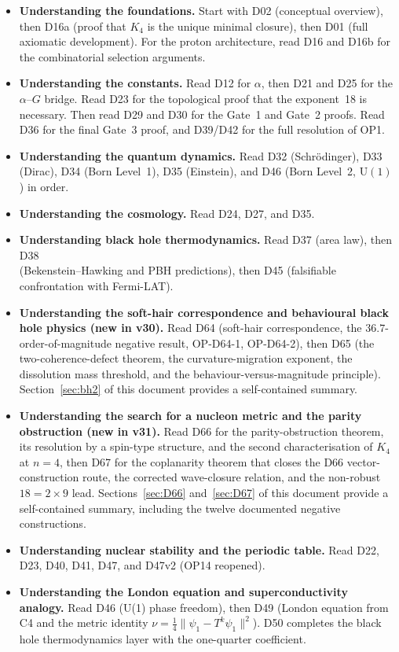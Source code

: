\documentclass[11pt,a4paper]{article}
\theoremstyle{plain}
\theoremstyle{definition}
\theoremstyle{remark}
\begin{document}
\begin{itemize}
\item \textbf{Understanding the foundations.} Start with D02 (conceptual overview), then D16a (proof that $K_4$ is the unique minimal closure), then D01 (full axiomatic development). For the proton architecture, read D16 and D16b for the combinatorial selection arguments.
\item \textbf{Understanding the constants.} Read D12 for $\alpha$, then D21 and D25 for the $\alpha$--$G$ bridge. Read D23 for the topological proof that the exponent~18 is necessary. Then read D29 and D30 for the Gate~1 and Gate~2 proofs. Read D36 for the final Gate~3 proof, and D39/D42 for the full resolution of OP1.
\item \textbf{Understanding the quantum dynamics.} Read D32 (Schr\"odinger), D33 (Dirac), D34 (Born Level~1), D35 (Einstein), and D46 (Born Level~2, $\mathrm{U}(1)$) in order.
\item \textbf{Understanding the cosmology.} Read D24, D27, and D35.
\item \textbf{Understanding black hole thermodynamics.} Read D37 (area law), then D38 \\ (Bekenstein--Hawking and PBH predictions), then D45 (falsifiable confrontation with Fermi-LAT).
\item \textbf{Understanding the soft-hair correspondence and behavioural black hole physics (new in v30).} Read D64 (soft-hair correspondence, the $36.7$-order-of-magnitude negative result, OP-D64-1, OP-D64-2), then D65 (the two-coherence-defect theorem, the curvature-migration exponent, the dissolution mass threshold, and the behaviour-versus-magnitude principle). Section~\ref{sec:bh2} of this document provides a self-contained summary.
\item \textbf{Understanding the search for a nucleon metric and the parity obstruction (new in v31).} Read D66 for the parity-obstruction theorem, its resolution by a spin-type structure, and the second characterisation of $K_4$ at $n=4$, then D67 for the coplanarity theorem that closes the D66 vector-construction route, the corrected wave-closure relation, and the non-robust $18=2\times9$ lead. Sections~\ref{sec:D66} and~\ref{sec:D67} of this document provide a self-contained summary, including the twelve documented negative constructions.
\item \textbf{Understanding nuclear stability and the periodic table.} Read D22, D23, D40, D41, D47, and D47v2 (OP14 reopened).
\item \textbf{Understanding the London equation and superconductivity analogy.} Read D46 (U(1) phase freedom), then D49 (London equation from C4 and the metric identity $\nu = \tfrac{1}{4}\|\psi_1 - T^k\psi_1\|^2$). D50 completes the black hole thermodynamics layer with the one-quarter coefficient.

\end{itemize}
\end{document}
